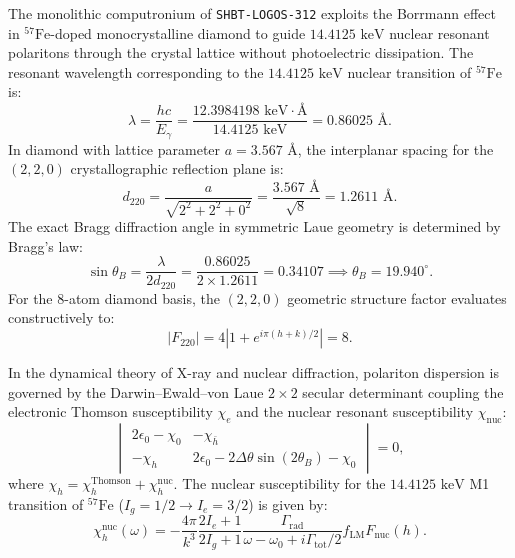 \documentclass[11pt,onecolumn]{article}
\begin{document}
The monolithic computronium of \texttt{SHBT-LOGOS-312} exploits the Borrmann effect in $^{57}\text{Fe}$-doped monocrystalline diamond to guide $14.4125\text{ keV}$ nuclear resonant polaritons through the crystal lattice without photoelectric dissipation. The resonant wavelength corresponding to the $14.4125\text{ keV}$ nuclear transition of $^{57}\text{Fe}$ is:
\begin{equation}
\lambda = \frac{h c}{E_\gamma} = \frac{12.3984198\text{ keV}\cdot\text{\AA}}{14.4125\text{ keV}} = 0.86025\text{ \AA}.
\end{equation}
In diamond with lattice parameter $a = 3.567\text{ \AA}$, the interplanar spacing for the $(2,2,0)$ crystallographic reflection plane is:
\begin{equation}
d_{220} = \frac{a}{\sqrt{2^2 + 2^2 + 0^2}} = \frac{3.567\text{ \AA}}{\sqrt{8}} = 1.2611\text{ \AA}.
\end{equation}
The exact Bragg diffraction angle in symmetric Laue geometry is determined by Bragg's law:
\begin{equation}
\sin \theta_B = \frac{\lambda}{2 d_{220}} = \frac{0.86025}{2 \times 1.2611} = 0.34107 \implies \theta_B = 19.940^\circ.
\end{equation}
For the 8-atom diamond basis, the $(2,2,0)$ geometric structure factor evaluates constructively to:
\begin{equation}
|F_{220}| = 4\left| 1 + e^{i\pi(h+k)/2} \right| = 8.
\end{equation}

In the dynamical theory of X-ray and nuclear diffraction, polariton dispersion is governed by the Darwin--Ewald--von Laue $2\times 2$ secular determinant coupling the electronic Thomson susceptibility $\chi_e$ and the nuclear resonant susceptibility $\chi_{\text{nuc}}$:
\begin{equation}
\begin{vmatrix}
2\epsilon_0 - \chi_0 & -\chi_{\bar{h}} \\
-\chi_h & 2\epsilon_0 - 2\Delta\theta\sin(2\theta_B) - \chi_0
\end{vmatrix} = 0,
\label{eq:darwin_ewald_secular}
\end{equation}
where $\chi_h = \chi_h^{\text{Thomson}} + \chi_h^{\text{nuc}}$. The nuclear susceptibility for the $14.4125\text{ keV}$ M1 transition of $^{57}\text{Fe}$ ($I_g = 1/2 \to I_e = 3/2$) is given by:
\begin{equation}
\chi_h^{\text{nuc}}(\omega) = -\frac{4\pi}{k^3} \frac{2I_e+1}{2I_g+1} \frac{\Gamma_{\text{rad}}}{\omega - \omega_0 + i\Gamma_{\text{tot}}/2} f_{\text{LM}} F_{\text{nuc}}(h).
\end{equation}
\end{document}
